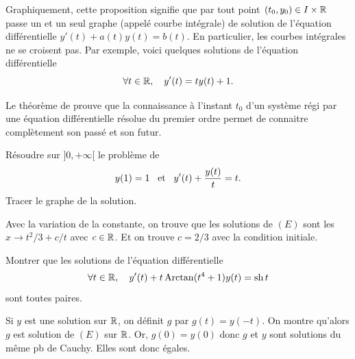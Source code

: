 \documentclass{magnoliaold}
\begin{document}
\begin{remarques}
\remarque Graphiquement, cette proposition signifie que par tout
  point $(t_0,y_0)\in I\times \mathbb{R}$ passe un et un seul graphe (appelé courbe
  intégrale) de solution de l'équation différentielle $y'(t)+a(t) y(t)=b(t)$. En
  particulier, les courbes intégrales ne se croisent pas. Par exemple, voici quelques
  solutions de l'équation différentielle
  \[\forall t\in\mathbb{R},\quad y'(t)=ty(t)+1.\]
\begin{center}
\end{center}
\remarque Le théorème de  prouve que la connaissance à l'instant $t_0$ d'un système régi par une équation différentielle résolue du premier ordre permet de connaitre complètement son passé et son futur.
\end{remarques}

\begin{exos}
\exo Résoudre sur $]0,+\infty[$ le problème de 
  \[y(1)=1 \quad\!\text{et}\quad\! y'(t)+\frac{y(t)}{t}=t.\]
Tracer le graphe de la solution.
\begin{sol}
Avec la variation de la constante, on trouve que les solutions de $(E)$ sont les $x\to t^2/3+c/t$ avec $c\in \mathbb{R}$. Et on trouve $c=2/3$ avec la condition initiale.
\end{sol}
\exo Montrer que les solutions de l'équation différentielle
  \[\forall t\in\mathbb{R} ,\quad y'(t)+t\operatorname{Arctan}(t^4+1)y(t)=\operatorname{sh} t\]
  sont toutes paires.
\end{exos}
\begin{sol}
Si $y$ est une solution sur $\mathbb{R}$, on définit $g$ par $g(t)=y(-t)$. On montre qu'alors $g$ est solution de $(E)$ sur $\mathbb{R}$. Or, $g(0)=y(0)$ donc $g$ et $y$ sont solutions du même pb de Cauchy. Elles sont donc égales.
\end{sol}
\end{document}
